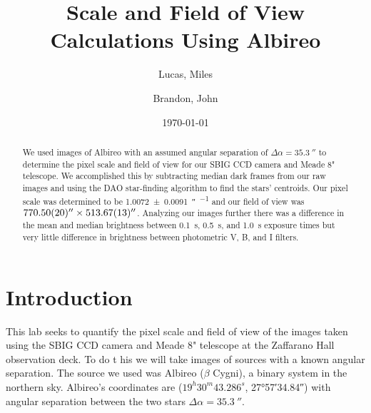 \documentclass[%
aip,
jmp,
reprint,
floatfix,
nobibfootnote,
]{revtex4-1}
\begin{document}
	
	\title[Scale and FOV Calculations Using Albireo]{Scale and Field of View Calculations Using Albireo}
	
	\author{Lucas, Miles}
	\author{Brandon, John}
	
	\date{\today}
	
	

	\begin{abstract}
	
	We used images of Albireo with an assumed angular separation of $\Delta\alpha = \SI{35.3}{\arcsecond}$ to determine the pixel scale and field of view for our SBIG CCD camera and Meade 8" telescope. We accomplished this by subtracting median dark frames from our raw images and using the DAO star-finding algorithm to find the stars' centroids. Our pixel scale was determined to be \SI{1.0072+-0.0091}{\arcsecond\per\pixel} and our field of view was $\SI{770.50+-0.20}{\arcsecond}\times\SI{513.67+-0.13}{\arcsecond}$. Analyzing our images further there was a difference in the mean and median brightness between \SI{0.1}{\second}, \SI{0.5}{\second}, and \SI{1.0}{\second} exposure times but very little difference in brightness between photometric V, B, and I filters. 
		
	\end{abstract}
	
	\maketitle
	

	\section{Introduction}
	
	This lab seeks to quantify the pixel scale and field of view of the images taken using the SBIG CCD camera and Meade 8" telescope at the Zaffarano Hall observation deck. To do t his we will take images of sources with a known angular separation. The source we used was Albireo ($\beta$ Cygni), a binary system in the northern sky. Albireo's coordinates are ($19^h30^m43.286^s$, \ang{+27;57;34.84}) with angular separation between the two stars $\Delta\alpha=\SI{35.3}{\arcsecond}$.
	
\end{document}
